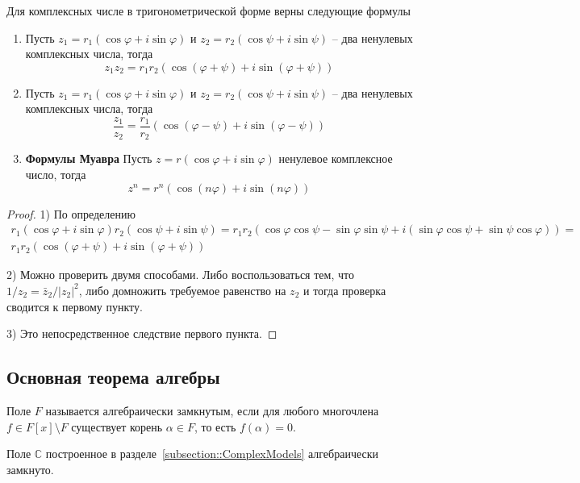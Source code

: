 \begin{claim*}
Для комплексных числе в тригонометрической форме верны следующие формулы
\begin{enumerate}
\item Пусть $z_1 = r_1(\cos \varphi + i \sin \varphi)$ и $z_2=r_2(\cos \psi + i \sin \psi)$ -- два ненулевых комплексных числа, тогда
\[
z_1 z_2 = r_1 r_2 (\cos(\varphi + \psi) + i\sin(\varphi + \psi))
\]

\item Пусть $z_1 = r_1(\cos \varphi + i \sin \varphi)$ и $z_2=r_2(\cos \psi + i \sin \psi)$ -- два ненулевых комплексных числа, тогда
\[
\frac{z_1}{z_2} = \frac{r_1}{r_2}(\cos(\varphi - \psi) + i\sin(\varphi - \psi))
\]

\item {\bf Формулы Муавра}
Пусть $z = r(\cos \varphi + i \sin \varphi)$ ненулевое комплексное число, тогда
\[
z^n = r^n (\cos(n \varphi) + i \sin(n \varphi))
\]
\end{enumerate}
\end{claim*}
\begin{proof}
1) По определению
\begin{gather*}
r_1(\cos \varphi + i \sin \varphi) r_2 (\cos \psi + i \sin \psi) = r_1 r_2 (\cos \varphi \cos \psi - \sin \varphi \sin \psi + i (\sin\varphi \cos \psi + \sin \psi \cos \varphi)) =\\ r_1r_2(\cos(\varphi + \psi) + i\sin (\varphi + \psi))
\end{gather*}

2) Можно проверить двумя способами.
Либо воспользоваться тем, что $1/z_2 = \bar z_2 /|z_2|^2$, либо домножить требуемое равенство на $z_2$ и тогда проверка сводится к первому пункту.

3) Это непосредственное следствие первого пункта.
\end{proof}


\subsection{Основная теорема алгебры}

\begin{definition}
Поле $F$ называется алгебраически замкнутым, если для любого многочлена $f\in F[x]\setminus F$ существует корень $\alpha\in F$, то есть $f(\alpha) = 0$.
\end{definition}


\begin{claim}
Поле $\mathbb C$ построенное в разделе~\ref{subsection::ComplexModels} алгебраически замкнуто.
\end{claim}


